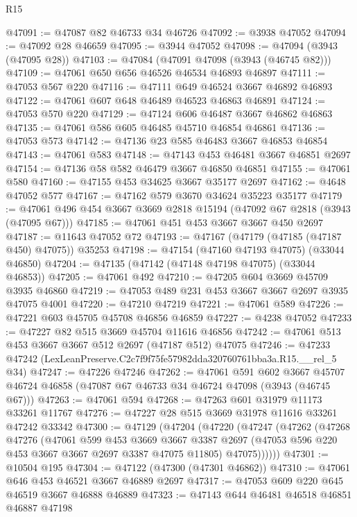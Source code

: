 \begin{lexlean}{R15}
\begin{coremodule}
@47091 := @47087 @82 @46733 @34 @46726
@47092 := @3938 @47052
@47094 := @47092 @28 @46659
@47095 := @3944 @47052
@47098 := @47094 (@3943 (@47095 @28))
@47103 := @47084 (@47091 @47098 (@3943 (@46745 @82)))
@47109 := @47061 @650 @656 @46526 @46534 @46893 @46897
@47111 := @47053 @567 @220
@47116 := @47111 @649 @46524 @3667 @46892 @46893
@47122 := @47061 @607 @648 @46489 @46523 @46863 @46891
@47124 := @47053 @570 @220
@47129 := @47124 @606 @46487 @3667 @46862 @46863
@47135 := @47061 @586 @605 @46485 @45710 @46854 @46861
@47136 := @47053 @573
@47142 := @47136 @23 @585 @46483 @3667 @46853 @46854
@47143 := @47061 @583
@47148 := @47143 @453 @46481 @3667 @46851 @2697
@47154 := @47136 @58 @582 @46479 @3667 @46850 @46851
@47155 := @47061 @580
@47160 := @47155 @453 @34625 @3667 @35177 @2697
@47162 := @4648 @47052 @577
@47167 := @47162 @579 @3670 @34624 @35223 @35177
@47179 := @47061 @496 @454 @3667 @3669 @2818 @15194 (@47092 @67 @2818 (@3943 (@47095 @67)))
@47185 := @47061 @451 @453 @3667 @3667 @450 @2697
@47187 := @11643 @47052 @72
@47193 := @47167 (@47179 (@47185 (@47187 @450) @47075)) @35253
@47198 := @47154 (@47160 @47193 @47075) (@33044 @46850)
@47204 := @47135 (@47142 (@47148 @47198 @47075) (@33044 @46853))
@47205 := @47061 @492
@47210 := @47205 @604 @3669 @45709 @3935 @46860
@47219 := @47053 @489 @231 @453 @3667 @3667 @2697 @3935 @47075 @4001
@47220 := @47210 @47219
@47221 := @47061 @589
@47226 := @47221 @603 @45705 @45708 @46856 @46859
@47227 := @4238 @47052
@47233 := @47227 @82 @515 @3669 @45704 @11616 @46856
@47242 := @47061 @513 @453 @3667 @3667 @512 @2697 (@47187 @512) @47075
@47246 := @47233 @47242 (LexLeanPreserve.C2c7f9f75fe57982dda320760761bba3a.R15.__rel_5 @34)
@47247 := @47226 @47246
@47262 := @47061
    @591
    @602
    @3667
    @45707
    @46724
    @46858
    (@47087 @67 @46733 @34 @46724 @47098 (@3943 (@46745 @67)))
@47263 := @47061 @594
@47268 := @47263 @601 @31979 @11173 @33261 @11767
@47276 := @47227 @28 @515 @3669 @31978 @11616 @33261 @47242 @33342
@47300 := @47129
    (@47204
      (@47220
        (@47247
          (@47262
            (@47268
              @47276
              (@47061
                @599
                @453
                @3669
                @3667
                @3387
                @2697
                (@47053 @596 @220 @453 @3667 @3667 @2697 @3387 @47075 @11805)
                @47075))))))
@47301 := @10504 @195
@47304 := @47122 (@47300 (@47301 @46862))
@47310 := @47061 @646 @453 @46521 @3667 @46889 @2697
@47317 := @47053 @609 @220 @645 @46519 @3667 @46888 @46889
@47323 := @47143 @644 @46481 @46518 @46851 @46887 @47198

\end{coremodule}
\end{lexlean}

